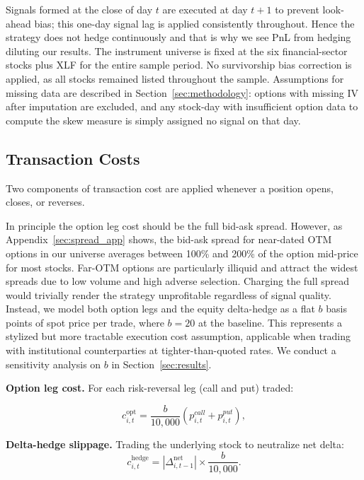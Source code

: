 \documentclass[12pt, a4paper]{article}
\begin{document}
Signals formed at the close of day $t$ are executed at day $t+1$ to prevent look-ahead bias; this one-day signal lag is applied consistently throughout. Hence the strategy does not hedge continuously and that is why we see PnL from hedging diluting our results. The instrument universe is fixed at the six financial-sector stocks plus XLF for the entire sample period. No survivorship bias correction is applied, as all stocks remained listed throughout the sample. Assumptions for missing data are described in Section~\ref{sec:methodology}: options with missing IV after imputation are excluded, and any stock-day with insufficient option data to compute the skew measure is simply assigned no signal on that day.

\subsection{Transaction Costs}
\label{sec:txn_costs}

Two components of transaction cost are applied whenever a position opens, closes, or reverses.

In principle the option leg cost should be the full bid-ask spread. However, as Appendix~\ref{sec:spread_app} shows, the bid-ask spread for near-dated OTM options in our universe averages between 100\% and 200\% of the option mid-price for most stocks. Far-OTM options are particularly illiquid and attract the widest spreads due to low volume and high adverse selection. Charging the full spread would trivially render the strategy unprofitable regardless of signal quality. Instead, we model both option legs and the equity delta-hedge as a flat $b$ basis points of spot price per trade, where $b = 20$ at the baseline. This represents a stylized but more tractable execution cost assumption, applicable when trading with institutional counterparties at tighter-than-quoted rates. We conduct a sensitivity analysis on $b$ in Section~\ref{sec:results}.

\textbf{Option leg cost.} For each risk-reversal leg (call and put) traded:

\begin{equation}
    c^{\mathrm{opt}}_{i,t}
    = \frac{b}{10{,}000} (p_{i,t}^{call} +p_{i,t}^{put}),
    \label{eq:opt_spread_cost}
\end{equation}

\textbf{Delta-hedge slippage.} Trading the underlying stock to neutralize net delta:
\begin{equation}
    c^{\mathrm{hedge}}_{i,t}
    = |\Delta^{\mathrm{net}}_{i,t-1}|
      \times \frac{b}{10{,}000}.
    \label{eq:hedge_cost}
\end{equation}
\end{document}
